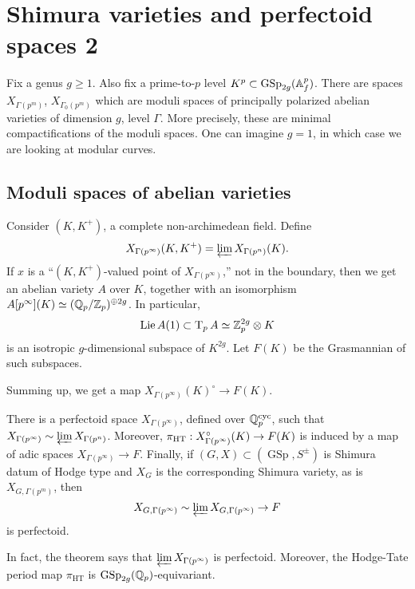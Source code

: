 
\section{Shimura varieties and perfectoid spaces 2}




Fix a genus $g\geqslant 1$. Also fix a prime-to-$p$ level 
$K^p\subset \operatorname{GSp}_{2 g}(\mathbb{A}_f^p)$. There are spaces 
$X_{\Gamma(p^m)}$, $X_{\Gamma_0(p^m)}$ which are moduli spaces of principally 
polarized abelian varieties of dimension $g$, level $\Gamma$. More 
precisely, these are minimal compactifications of the moduli spaces. 
One can imagine $g=1$, in which case we are looking at modular curves. 





\subsection{Moduli spaces of abelian varieties}

Consider $(K,K^+)$, a complete non-archimedean field. Define 
\[
  X_{\Gamma(p^\infty)}(K,K^+) = \varprojlim X_{\Gamma(p^n)}(K) .
\]
If $x$ is a ``$(K,K^+)$-valued point of $X_{\Gamma(p^\infty)}$,'' not in 
the boundary, then we get an abelian variety $A$ over $K$, together with an 
isomorphism $A[p^{\infty}](K) \simeq (\mathbb{Q}_p/\mathbb{Z}_p)^{\oplus 2 g}$. In particular, 
\[
  \operatorname{Lie} A(1)\subset\operatorname T_p A \simeq \mathbb{Z}_p^{2 g}\otimes K
\]
is an isotropic $g$-dimensional subspace of $K^{2 g}$. Let 
$F(K)$ be the Grasmannian of such subspaces. 

Summing up, we get a map $X_{\Gamma(p^\infty)}(K)^\circ \to F(K)$. 

\begin{theorem}
There is a perfectoid space $X_{\Gamma(p^\infty)}$, defined over 
$\mathbb{Q}_p^\textnormal{cyc}$, such that 
$X_{\Gamma(p^\infty)}\sim \varprojlim X_{\Gamma(p^n)}$. Moreover, 
$\pi_\textnormal{HT}:X_{\Gamma(p^\infty)}^\circ(K) \to F(K)$ is induced by a 
map of adic spaces $X_{\Gamma(p^\infty)} \to F$. Finally, if 
$(G,X)\subset (\operatorname{GSp},S^\pm)$ is Shimura datum of Hodge type and 
$X_G$ is the corresponding Shimura variety, as is 
$X_{G,\Gamma(p^m)}$, then 
\[
  X_{G,\Gamma(p^\infty)} \sim \varprojlim X_{G,\Gamma(p^\infty)} \to F
\]
is perfectoid. 
\end{theorem}
In fact, the theorem says that $\varprojlim X_{\Gamma(p^\infty)}$ is 
perfectoid. Moreover, the Hodge-Tate period map 
$\pi_\text{HT}$ is $\operatorname{GSp}_{2 g}(\mathbb{Q}_p)$-equivariant. 

